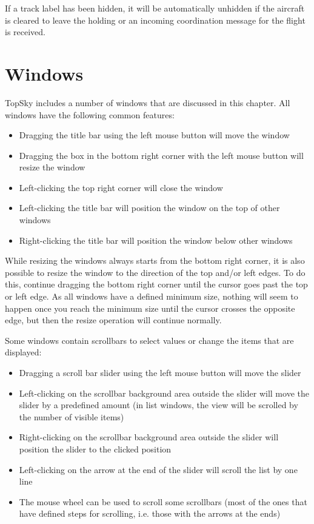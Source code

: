 \documentclass[11pt,a4paper]{memoir}
\begin{document}
If a track label has been hidden, it will be automatically unhidden if the aircraft is cleared to leave the holding or an incoming coordination message for the flight is received.

\section{Windows}
TopSky includes a number of windows that are discussed in this chapter. All windows have the following common features:

\begin{itemize}
    \item Dragging the title bar using the left mouse button will move the window
    \item Dragging the box in the bottom right corner with the left mouse button will resize the window
    \item Left-clicking the top right corner will close the window
    \item Left-clicking the title bar will position the window on the top of other windows
    \item Right-clicking the title bar will position the window below other windows
\end{itemize}

While resizing the windows always starts from the bottom right corner, it is also possible to resize the window to the direction of the top and/or left edges. To do this, continue dragging the bottom right corner until the cursor goes past the top or left edge. As all windows have a defined minimum size, nothing will seem to happen once you reach the minimum size until the cursor crosses the opposite edge, but then the resize operation will continue normally.

Some windows contain scrollbars to select values or change the items that are displayed:

\begin{itemize}
    \item Dragging a scroll bar slider using the left mouse button will move the slider
    \item Left-clicking on the scrollbar background area outside the slider will move the slider by a predefined amount (in list windows, the view will be scrolled by the number of visible items)
    \item Right-clicking on the scrollbar background area outside the slider will position the slider to the clicked position
    \item Left-clicking on the arrow at the end of the slider will scroll the list by one line
    \item The mouse wheel can be used to scroll some scrollbars (most of the ones that have defined steps for scrolling, i.e. those with the arrows at the ends)
\end{itemize}
\end{document}
